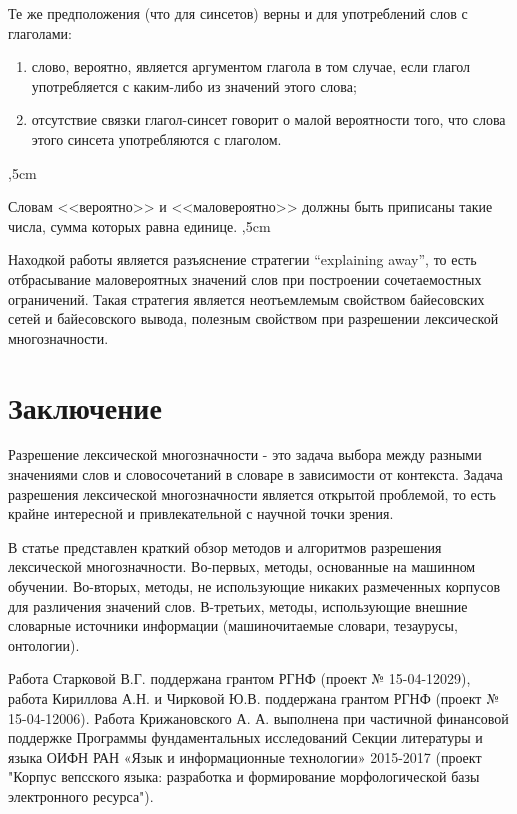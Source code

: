 \documentclass{article}
\begin{document}
\begin{articletext}
Те же предположения (что для синсетов) верны и для употреблений слов с глаголами:
\begin{enumerate}
\item слово, вероятно, является аргументом глагола в том случае, если глагол употребляется с каким-либо из значений этого слова;
\item отсутствие связки глагол-синсет говорит о малой вероятности того, что слова этого синсета употребляются с глаголом.
\end{enumerate}
,5cm

Словам <<вероятно>> и <<маловероятно>> должны быть приписаны такие числа, сумма которых равна единице. 
,5cm

Находкой работы \cite{Ciaramita 2000} является разъяснение стратегии “explaining away”, то есть отбрасывание маловероятных значений слов при построении сочетаемостных ограничений. Такая стратегия является неотъемлемым свойством байесовских сетей и байесовского вывода, полезным свойством при разрешении лексической многозначности. 

\section{Заключение}

Разрешение лексической многозначности - это задача выбора между разными значениями слов и словосочетаний в словаре в зависимости от контекста. Задача разрешения лексической многозначности является открытой проблемой, то есть крайне интересной и привлекательной с научной точки зрения.

В статье представлен краткий обзор методов и алгоритмов разрешения лексической многозначности. Во-первых, методы, основанные на машинном обучении.  Во-вторых, методы, не использующие никаких размеченных корпусов для различения значений слов. В-третьих, методы, использующие внешние словарные источники информации (машиночитаемые словари, тезаурусы, онтологии).

Работа Старковой В.Г. поддержана грантом РГНФ (проект № 15-04-12029), работа Кириллова А.Н. и Чирковой Ю.В. поддержана грантом РГНФ (проект № 15-04-12006). Работа Крижановского А. А. выполнена при частичной финансовой поддержке Программы фундаментальных исследований Секции литературы и языка ОИФН РАН «Язык  и информационные технологии» 2015-2017 (проект "Корпус вепсского языка: разработка и формирование морфологической базы электронного ресурса").
 
\begin{thebibliography}{9}


\end{thebibliography}
\end{articletext}
\end{document}

